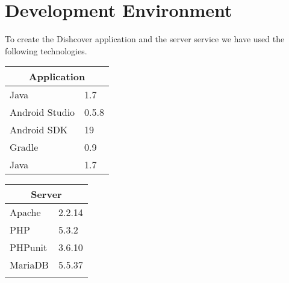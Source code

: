 \chapter*{Development Environment}

To create the Dishcover application and the server service we have used the following technologies. \\

\begin{minipage}{0.5\columnwidth}
\centering
\begin{tabular}{l l}
\multicolumn{2}{c}{Application}\\
\hline
Java & 1.7\\
Android Studio & 0.5.8\\
Android SDK & 19\\
Gradle & 0.9\\
Java & 1.7\\
\end{tabular}
\end{minipage}
\hspace{0.5cm}
\begin{minipage}{0.5\columnwidth}
\centering
\begin{tabular}{l l}
\multicolumn{2}{c}{Server}\\
\hline
Apache & 2.2.14\\
PHP & 5.3.2\\
PHPunit & 3.6.10\\
MariaDB & 5.5.37\\
\multicolumn{2}{c}{}\\%
\end{tabular}
\end{minipage}



